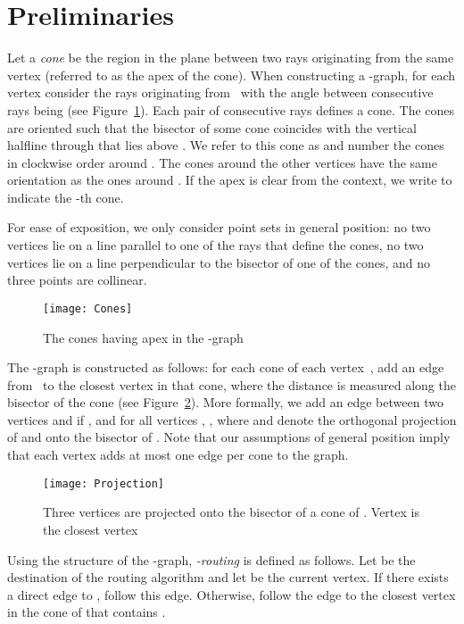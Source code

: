 \documentclass[12pt]{article}
\begin{document}
\section{Preliminaries}
\label{sec:Preliminaries}
Let a \emph{cone} be the region in the plane between two rays originating from the same vertex (referred to as the apex of the cone). When constructing a -graph, for each vertex  consider the rays originating from~ with the angle between consecutive rays being  (see Figure~\ref{fig:Cones}). Each pair of consecutive rays defines a cone. The cones are oriented such that the bisector of some cone coincides with the vertical halfline through  that lies above . We refer to this cone as  and number the cones in clockwise order around . The cones around the other vertices have the same orientation as the ones around . If the apex is clear from the context, we write  to indicate the -th cone. 

For ease of exposition, we only consider point sets in general position: no two vertices lie on a line parallel to one of the rays that define the cones, no two vertices lie on a line perpendicular to the bisector of one of the cones, and no three points are collinear. 

\begin{figure}[ht]
  \begin{center}
    \texttt{[image: Cones]}
  \end{center}
  \caption{The cones having apex  in the -graph}
  \label{fig:Cones}
\end{figure}

The -graph is constructed as follows: for each cone  of each vertex~, add an edge from~ to the closest vertex in that cone, where the distance is measured along the bisector of the cone (see Figure~\ref{fig:Projection}). More formally, we add an edge between two vertices  and  if , and for all vertices , , where  and  denote the orthogonal projection of  and  onto the bisector of . Note that our assumptions of general position imply that each vertex adds at most one edge per cone to the graph. 

\begin{figure}[ht]
  \begin{center}
    \texttt{[image: Projection]}
  \end{center}
  \caption{Three vertices are projected onto the bisector of a cone of . Vertex  is the closest vertex}
  \label{fig:Projection}
\end{figure}

Using the structure of the -graph, \emph{-routing} is defined as follows. Let  be the destination of the routing algorithm and let  be the current vertex. If there exists a direct edge to , follow this edge. Otherwise, follow the edge to the closest vertex in the cone of  that contains . 
\end{document}
